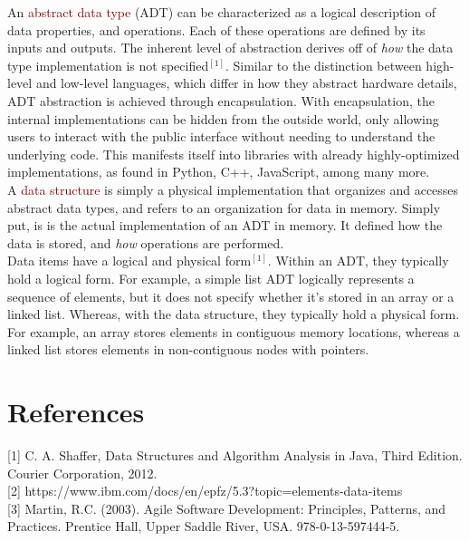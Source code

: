 An \textcolor{Maroon}{abstract data type} (ADT) can be characterized as a logical description of data properties, and operations. Each of these operations are defined by its inputs and outputs. The inherent level of abstraction derives off of \textit{how} the data type implementation is not specified$^{[1]}$. Similar to the distinction between high-level and low-level languages, which differ in how they abstract hardware details, ADT abstraction is achieved through encapsulation. With encapsulation, the internal implementations can be hidden from the outside world, only allowing users to interact with the public interface without needing to understand the underlying code. This manifests itself into libraries with already highly-optimized implementations, as found in Python, C++, JavaScript, among many more.
\\

A \textcolor{Maroon}{data structure} is simply a physical implementation that organizes and accesses abstract data types, and refers to an organization for data in memory. Simply put, is is the actual implementation of an ADT in memory. It defined how the data is stored, and \textit{how} operations are performed.
\\ 

Data items have a logical and physical form$^{[1]}$. Within an ADT, they typically hold a logical form. For example, a simple list ADT logically represents a sequence of elements, but it does not specify whether it's stored in an array or a linked list. Whereas, with the data structure, they typically hold a physical form. For example, an array stores elements in contiguous memory locations, whereas a linked list stores elements in non-contiguous nodes with pointers. 

\section{References}
[1] C. A. Shaffer, Data Structures and Algorithm Analysis in Java, Third Edition. Courier Corporation, 2012.
\\

[2] https://www.ibm.com/docs/en/epfz/5.3?topic=elements-data-items
\\

[3] Martin, R.C. (2003). Agile Software Development: Principles, Patterns, and Practices. Prentice Hall, Upper Saddle River, USA. 978-0-13-597444-5.